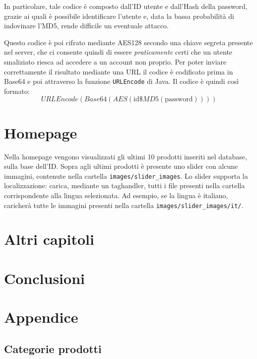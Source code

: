 In particolare, tale codice è composto dall'ID utente e dall'Hash della password, grazie ai quali è possibile identificare l'utente e, data la bassa probabilità di indovinare l'MD5, rende difficile un eventuale attacco.

Questo codice è poi cifrato mediante AES128 secondo una chiave segreta presente nel server, che ci consente quindi di essere \textit{praticamente} certi che un utente smaliziato riesca ad accedere a un account non proprio. Per poter inviare correttamente il risultato mediante una URL il codice è codificato prima in Base64 e poi attraverso la funzione \texttt{URLEncode} di Java. Il codice è quindi così formato:
\[
    URLEncode( Base64( AES( \mbox{id}\$MD5(\mbox{password}))))
\]

\chapter{Homepage}
Nella homepage vengono visualizzati gli ultimi 10 prodotti inseriti nel database, sulla base dell'ID. Sopra agli ultimi prodotti è presente uno slider con alcune immagini, contenute nella cartella \texttt{images/slider\_images}. Lo slider supporta la localizzazione: carica, mediante un taghandler, tutti i file presenti nella cartella corrispondente alla lingua selezionata. Ad esempio, se la lingua è italiano, caricherà tutte le immagini presenti nella cartella \texttt{images/slider\_images/it/}.




\chapter{Altri capitoli}
\chapter{Conclusioni}

\chapter{Appendice}
\section{Categorie prodotti}



